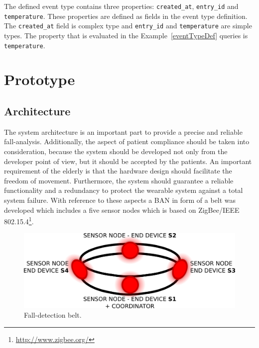 \documentclass[conference]{IEEEtran}
\theoremstyle{definition}
\begin{document}
The defined event type contains three properties: \texttt{created\_at},
\texttt{entry\_id} and \texttt{temperature}. These properties are defined as
fields in the event type definition. The \texttt{created\_at} field is complex
type and \texttt{entry\_id} and \texttt{temperature} are simple types. The
property that is evaluated in the Example~\ref{eventTypeDef} queries is
\texttt{temperature}.

\section{Prototype}
\label{sec:basicprototype}

\subsection{Architecture}
\label{sub:basicprototypearchitecture}

The system architecture is an important part to provide a precise and reliable fall-analysis. 
Additionally, the aspect of patient compliance should be taken into consideration, because the 
system should be developed not only from the developer point of view, but it should be accepted 
by the patients. An important requirement of the elderly is that the hardware design should 
facilitate the freedom of movement. Furthermore, the system should guarantee a reliable 
functionality and a redundancy to protect the wearable system against a total system failure. 
With reference to these aspects a BAN in form of a belt was developed which 
includes a five sensor nodes which is based on ZigBee/IEEE 802.15.4\footnote{\url{http://www.zigbee.org/}}.

\begin{figure}[!h]
  \centering
  \includegraphics[scale=0.25]{./img/belt}
  \caption[Fall-detection belt]{Fall-detection belt.}
  \label{fig:belt}
\end{figure}
\end{document}

